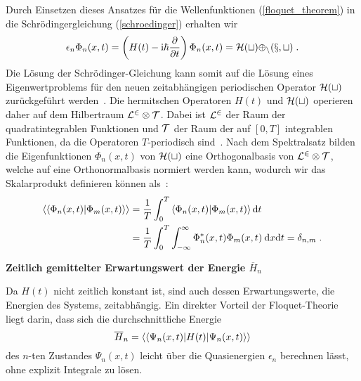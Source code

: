   Durch Einsetzen dieses Ansatzes für die Wellenfunktionen (\ref{floquet_theorem}) in die Schrödingergleichung (\ref{schroedinger}) erhalten wir
  \begin{equation}
    \epsilon_n \Phi_n(x,t) = \left(H(t)-\text{i}\hbar\frac{\partial}{\partial t}\right)\Phi_n(x,t) = \cal{H}(t) \Phi_n(x,t) \; .
    \label{eigenwertproblem}
  \end{equation}
  Die Lösung der Schrödinger-Gleichung kann somit auf die Lösung eines Eigenwertproblems für den neuen zeitabhängigen periodischen Operator $\cal{H}(t)$ zurückgeführt werden~\cite{sherly}.
  Die hermitschen Operatoren $H(t)$ und $\cal H(t)$ operieren daher auf dem Hilbertraum $\cal{L}^2 \otimes \cal{T}$.
  Dabei ist $\cal{L}^2$ der Raum der quadratintegrablen Funktionen und $\cal{T}$ der Raum der auf $[0,T]$ integrablen Funktionen, da die Operatoren $T$-periodisch sind~\cite{haengi}.
  Nach dem Spektralsatz bilden die Eigenfunktionen $\Phi_n(x,t)$ von $\cal{H}(t)$ eine Orthogonalbasis von $\cal{L}^2 \otimes \cal{T}$, welche auf eine Orthonormalbasis normiert werden kann, wodurch wir das Skalarprodukt definieren können als~\cite{haengi}:
  \begin{align}
    \begin{split}
    \braket{\braket{\Phi_n(x,t)|\Phi_m(x,t)}} &= \frac{1}{T} \int_0^T \braket{\Phi_n(x,t)|\Phi_m(x,t)} \text{d}t \\
    &= \frac{1}{T} \int_0^T \int_{-\infty}^{\infty} \Phi_n^*(x,t)\Phi_m(x,t) \: \text{d}x\text{d}t = \delta_{n,m} \; .
    \label{skalarprodukt_einzelner}
    \end{split}
  \end{align}

\textbf{Zeitlich gemittelter Erwartungswert der Energie $\overline{H}_n$}

    Da $H(t)$ nicht zeitlich konstant ist, sind auch dessen Erwartungswerte, die Energien des Systems, zeitabhängig.
    Ein direkter Vorteil der Floquet-Theorie liegt darin, dass sich die durchschnittliche Energie
    \begin{equation}
      \overline{H}_n  = \braket{\braket{\Psi_n(x,t)|H(t)|\Psi_n(x,t)}}
    \end{equation}
    des $n$-ten Zustandes $\Psi_n(x,t)$ leicht über die Quasienergien $\epsilon_n$ berechnen lässt, ohne explizit Integrale zu lösen.

